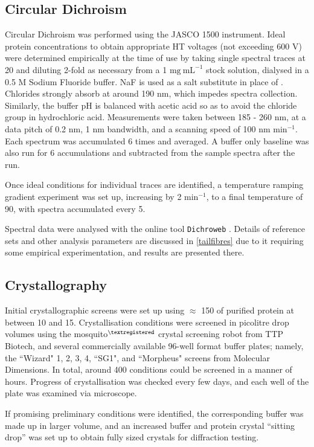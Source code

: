 \subsection{Circular Dichroism}
	Circular Dichroism was performed using the JASCO 1500 instrument. Ideal protein concentrations to obtain appropriate HT voltages (not exceeding 600 V) were determined empirically at the time of use by taking single spectral traces at 20\degC{} and diluting 2-fold as necessary from a 1 $\mathrm{mg\ mL}^{-1}$ stock solution, dialysed in a 0.5 M Sodium Fluoride buffer. NaF is used as a salt substitute in place of \NaCl. Chlorides strongly absorb at around 190 nm, which impedes spectra collection. Similarly, the buffer pH is balanced with acetic acid so as to avoid the chloride group in hydrochloric acid. Measurements were taken between 185 - 260 nm, at a data pitch of 0.2 nm, 1 nm bandwidth, and a scanning speed of 100 nm min$^{-1}$. Each spectrum was accumulated 6 times and averaged. A buffer only baseline was also run for 6 accumulations and subtracted from the sample spectra after the run.

Once ideal conditions for individual traces are identified, a temperature ramping gradient experiment was set up, increasing by 2\degC{} min$^{-1}$, to a final temperature of 90\degC, with spectra accumulated every 5\degC.

Spectral data were analysed with the online tool \texttt{Dichroweb} \citep{Whitmore2004}. Details of reference sets and other analysis parameters are discussed in \vref{tailfibres} due to it requiring some empirical experimentation, and results are presented there.

\subsection{Crystallography}
Initial crystallographic screens were set up using $\approx$ 150\ul{} of purified protein at between 10 and 15\mgml. Crystallisation conditions were screened in picolitre drop volumes using the mosquito$^{\textregistered}$ crystal screening robot from TTP Biotech, and several commercially available 96-well format buffer plates; namely, the ``Wizard" 1, 2, 3, 4, ``SG1", and ``Morpheus" screens from Molecular Dimensions. In total, around 400 conditions could be screened in a manner of hours. Progress of crystallisation was checked every few days, and each well of the plate was examined via microscope.

If promising preliminary conditions were identified, the corresponding buffer was made up in larger volume, and an increased buffer and protein crystal ``sitting drop'' was set up to obtain fully sized crystals for diffraction testing.

